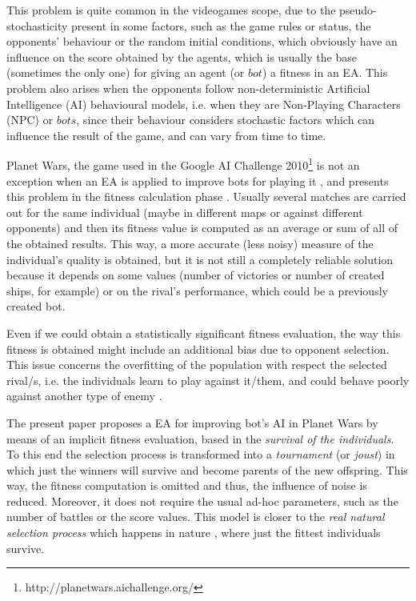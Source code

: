 \documentclass[conference]{IEEEtran}
\begin{document}
This problem is quite common in the videogames scope, due to the
pseudo-stochasticity present in some factors, such as the game rules
or status, the opponents' behaviour or the random initial conditions,
which obviously have an influence on the score obtained by the agents,
which is usually the base (sometimes the only one) for giving an agent (or $bot$) a
fitness in an EA.
This problem also arises when the opponents follow non-deterministic
Artificial Intelligence (AI) behavioural models, i.e. when they are
Non-Playing Characters (NPC) or $bots$, since their behaviour
considers stochastic factors which can influence the result of the
game, and can vary from time to time. %

Planet Wars, the game used in the Google AI Challenge
2010\footnote{http://planetwars.aichallenge.org/} is not an exception
when an EA is applied to improve bots for playing it
\cite{Genebot-IWANN2011,Genebot_CEC11,Genebot_CIG2012},  and presents
this problem in the fitness calculation phase \cite{Genebot_JCST}. Usually several matches are carried out for the same
individual (maybe in different maps or against different opponents)
and then its fitness value is computed as an average or sum of all of the obtained results. This way, a more accurate (less noisy) measure of the individual's quality is obtained, but it is not still a completely reliable solution because it depends on some values (number of victories or number of created ships, for example) or on the rival's performance, which could be a previously created bot.


Even if we could obtain a statistically significant fitness
evaluation, the way this fitness is obtained might include an additional
bias due to opponent selection. This issue concerns the overfitting
of the population with respect the selected rival/s, i.e. the
individuals learn to play against it/them, and could behave poorly
against another type of enemy \cite{Genebot_JCST,wilcoxon:ga}.


The present paper proposes a EA \cite{EAs_Back96} for improving bot's AI in Planet Wars by means of an implicit fitness evaluation,
based in the \textit{survival of the individuals}.
To this end the selection process is transformed into a \textit{tournament} (or \textit{joust}) in which just the winners will survive and become parents of the new offspring. This way, the fitness computation is omitted and thus, the influence of noise is reduced.  Moreover, it does not require the usual ad-hoc parameters, such as the number of battles or the score values.
This model is closer to the \textit{real natural selection process} which happens in nature \cite{darwin1859}, where just the fittest individuals survive.
\end{document}
